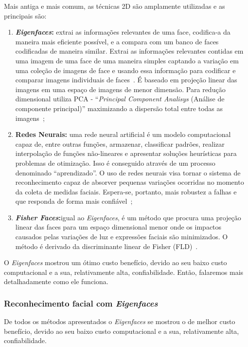 Mais antiga e mais comum, as técnicas 2D são amplamente utilizadas e as principais são:
	\begin{enumerate}
		\item \textbf{\textit{Eigenfaces}:} extrai as informações relevantes de uma face, codifica-a da maneira mais eficiente possível, e a compara com um banco de faces codificadas de maneira similar. Extrai as informações relevantes contidas em uma imagem de uma face de uma maneira simples captando a variação em uma coleção de imagens de face e usando essa informação para codificar e comparar imagens individuais de faces~\cite{turk}. É baseado em projeção linear das imagens em uma espaço de imagens de menor dimensão. Para redução dimensional utiliza PCA - ``\textit{Principal Component Analisys} (Análise de componente principal)'' maximizando a dispersão total entre todas as imagens~\cite{belhumeur};

		\item \textbf{Redes Neurais:} uma rede neural artificial é um modelo computacional capaz de, entre outras funções, armazenar, classificar padrões, realizar interpolação de funções não-lineares e apresentar soluções heurísticas para problemas de otimização. Isso é conseguido através de um processo denominado ``aprendizado''. O uso de redes neurais visa tornar o sistema de reconhecimento capaz de absorver pequenas variações ocorridas no momento da coleta de medidas faciais. Espera-se, portanto,  mais robustez a falhas e que responda de forma mais confiável~\cite{oliveira};

		\item \textbf{\textit{Fisher Faces}:}igual ao \textit{Eigenfaces}, é um método que procura uma projeção linear das faces para um espaço dimensional menor onde os impactos causados pelas variações de luz e expressões faciais são minimizados. O método é derivado da discriminante linear de Fisher (FLD)~\cite{belhumeur}.
	\end{enumerate}

O \textit{Eigenfaces} mostrou um ótimo custo benefício, devido ao seu baixo custo computacional e a sua, relativamente alta, confiabilidade. Então, falaremos mais detalhadamente como ele funciona.

\subsubsection{Reconhecimento facial com \textit{Eigenfaces}}

De todos os métodos apresentados o \textit{Eigenfaces} se mostrou o de melhor custo benefício, devido ao seu baixo custo computacional e a sua, relativamente alta, confiabilidade.

